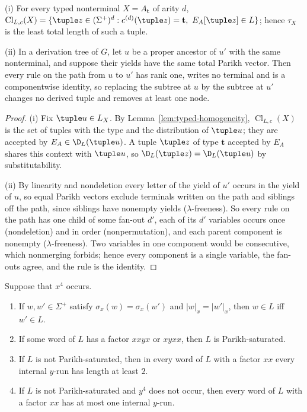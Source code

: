 \begin{lemma}\label{lem:app-two-basic}
\textup{(i)} For every typed nonterminal $X=A_{\mathbf t}$ of arity $d$,
$\operatorname{Cl}_{L,c}(X)=\{\tuple z\in(\Sigma^+)^d:c^{(d)}(\tuple z)=\mathbf t,\
E_A[\tuple z]\in L\}$; hence $\tau_X$ is the least total length of such a tuple.

\textup{(ii)} In a derivation tree of $G$, let $u$ be a proper ancestor of $u'$
with the same nonterminal, and suppose their yields have the same total Parikh
vector.  Then every rule on the path from $u$ to $u'$ has rank one, writes no
terminal and is a componentwise identity, so replacing the subtree at $u$ by the
subtree at $u'$ changes no derived tuple and removes at least one node.
\end{lemma}

\begin{proof}
(i) Fix $\tuple u\in L_X$.  By Lemma~\ref{lem:typed-homogeneity},
$\operatorname{Cl}_{L,c}(X)$ is the set of tuples with the type and the
distribution of $\tuple u$; they are accepted by $E_A\in\D_L(\tuple u)$.  A tuple
$\tuple z$ of type $\mathbf t$ accepted by $E_A$ shares this context with $\tuple u$,
so $\D_L(\tuple z)=\D_L(\tuple u)$ by substitutability.

(ii) By linearity and nondeletion every letter of the yield of $u'$ occurs in the
yield of $u$, so equal Parikh vectors exclude terminals written on the path
and siblings off the path, since siblings have nonempty yields
($\lambda$-freeness).  So every rule on the path has one child of some fan-out
$d'$, each of its $d'$ variables occurs once (nondeletion) and in order
(nonpermutation), and each parent component is nonempty ($\lambda$-freeness).
Two variables in one component would be consecutive, which nonmerging forbids;
hence every component is a single variable, the fan-outs agree, and the rule is
the identity.
\end{proof}

\begin{lemma}[Run exchanges]\label{lem:app-two-runs}
Suppose that $x^4$ occurs.
\begin{enumerate}[label=\textup{(\roman*)},leftmargin=*]
\item If $w,w'\in\Sigma^+$ satisfy $\sigma_x(w)=\sigma_x(w')$ and
$|w|_x=|w'|_x$, then $w\in L$ iff $w'\in L$.
\item If some word of $L$ has a factor $xxyx$ or $xyxx$, then $L$ is
Parikh-saturated.
\item If $L$ is not Parikh-saturated, then in every word of $L$ with a factor
$xx$ every internal $y$-run has length at least $2$.
\item If $L$ is not Parikh-saturated and $y^4$ does not occur, then every word
of $L$ with a factor $xx$ has at most one internal $y$-run.
\end{enumerate}
\end{lemma}

